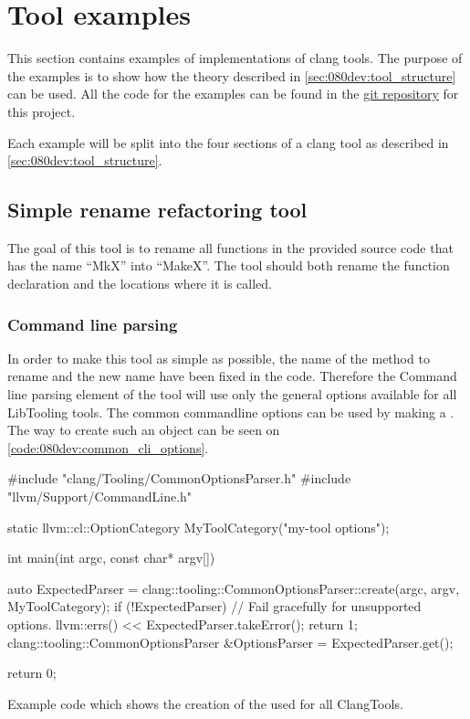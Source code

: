 \section{Tool examples}

This section contains examples of implementations of clang tools. The purpose of the examples is to show how the theory described in \cref{sec:080dev:tool_structure} can be used. All the code for the examples can be found in the \href{https://github.com/mortenhaahr/RD/tree/main/examples}{git repository} for this project. 

Each example will be split into the four sections of a clang tool as described in \cref{sec:080dev:tool_structure}.

\subsection{Simple rename refactoring tool}

The goal of this tool is to rename all functions in the provided source code that has the name ``MkX'' into ``MakeX''. The tool should both rename the function declaration and the locations where it is called.

\subsubsection*{Command line parsing}

In order to make this tool as simple as possible, the name of the method to rename and the new name have been fixed in the code. Therefore the Command line parsing element of the tool will use only the general options available for all LibTooling tools. The common commandline options can be used by making a . The way to create such an object can be seen on \cref{code:080dev:common_cli_options}.

\begin{listing}[H]
    \begin{cppcode}
#include "clang/Tooling/CommonOptionsParser.h"
#include "llvm/Support/CommandLine.h"

static llvm::cl::OptionCategory MyToolCategory("my-tool options");

int main(int argc, const char* argv[]) {
	auto ExpectedParser = clang::tooling::CommonOptionsParser::create(argc, argv, MyToolCategory);
	if (!ExpectedParser) {
		// Fail gracefully for unsupported options.
		llvm::errs() << ExpectedParser.takeError();
		return 1;
	}
	clang::tooling::CommonOptionsParser &OptionsParser = ExpectedParser.get();

    return 0;
}
    \end{cppcode}
    \caption{Example code which shows the creation of the  used for all ClangTools.}
    \label{code:080dev:common_cli_options}
\end{listing}

